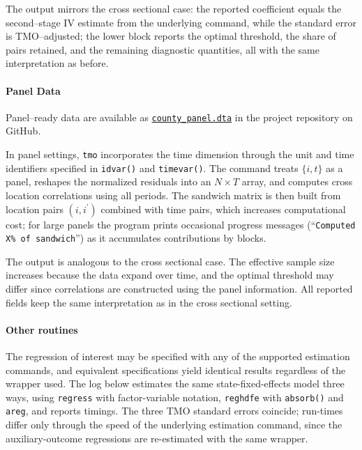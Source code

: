 \documentclass[varwidth,bib]{statapress}
\begin{document}
\begin{stlog}

\end{stlog}
The output mirrors the cross sectional case: the reported coefficient equals the
second–stage IV estimate from the underlying command, while the standard error is
TMO–adjusted; the lower block reports the optimal threshold, the share of pairs
retained, and the remaining diagnostic quantities, all with the same
interpretation as before.
\paragraph{Panel Data}
Panel–ready data are available as \href{https://raw.githubusercontent.com/wjnkim/tmo/master/example/county_panel.dta}{\texttt{county\_panel.dta}} in the project repository on GitHub.
\smallskip

In panel settings, \texttt{tmo} incorporates the time dimension through the unit and time identifiers specified in \texttt{idvar()} and \texttt{timevar()}. The command treats \(\{i,t\}\) as a panel, reshapes the normalized residuals into an \(N\times T\) array, and computes cross location correlations using all periods. The sandwich matrix is then built from location pairs \((i,i^\prime)\) combined with time pairs, which increases computational cost; for large panels the program prints occasional progress messages (``\texttt{Computed X\% of sandwich}'') as it accumulates contributions by blocks.

\begin{stlog}

\end{stlog}
The output is analogous to the cross sectional case. The effective sample size increases because the data expand over time, and the optimal threshold may differ since correlations are constructed using the panel information. All reported fields keep the same interpretation as in the cross sectional setting.
\paragraph{Other routines}
The regression of interest may be specified with any of the supported estimation commands, and equivalent specifications yield identical results regardless of the wrapper used.  The log below estimates the same state-fixed-effects model three ways, using {\tt regress} with factor-variable notation, {\tt reghdfe} with {\tt absorb()} and {\tt areg}, and reports timings.  The three TMO standard errors coincide; run-times differ only through the speed of the underlying estimation command, since the auxiliary-outcome regressions are re-estimated with the same wrapper.
\end{document}
